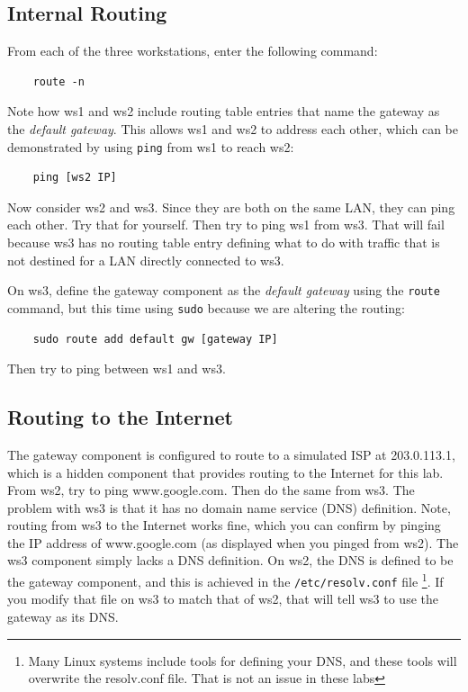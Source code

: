 \subsection{Internal Routing}
From each of the three workstations, enter the following command:
\begin{verbatim}
    route -n
\end{verbatim}
\noindent Note how ws1 and ws2 include routing table entries that name the
gateway as the \textit{default gateway}.  This allows ws1 and ws2 to address each other, which 
can be demonstrated by using \texttt{ping} from ws1 to reach ws2:

\begin{verbatim}
    ping [ws2 IP]
\end{verbatim}

Now consider ws2 and ws3.  Since they are both on the same LAN, they can ping
each other.  Try that for yourself.  Then try to ping ws1 from ws3.  That will
fail because ws3 has no routing table entry defining what to do with traffic 
that is not destined for a LAN directly connected to ws3.

On ws3, define the gateway component as the \textit{default gateway} using the 
\texttt{route} command, but this time using \texttt{sudo} because we are altering the routing:

\begin{verbatim}
    sudo route add default gw [gateway IP]
\end{verbatim}
\noindent Then try to ping between ws1 and ws3. 

\subsection{Routing to the Internet}
The gateway component is configured to route to a simulated ISP at 203.0.113.1, which 
is a hidden component that provides routing to the Internet for this lab.  From ws2, 
try to ping www.google.com.  Then do the same from ws3.  The problem with ws3 is that
it has no domain name service (DNS) definition.  Note, routing from ws3 to the Internet
works fine, which you can confirm by pinging the IP address of www.google.com (as displayed
when you pinged from ws2).  The ws3 component simply lacks a DNS definition. 
On ws2, the DNS is defined to be the
gateway component, and this is achieved in the \texttt{/etc/resolv.conf} file \footnote{
Many Linux systems include tools for defining your DNS, and these tools will overwrite
the resolv.conf file.  That is not an issue in these labs}.  If you 
modify that file on ws3 to match that of ws2, that will tell ws3 to use the gateway
as its DNS.

